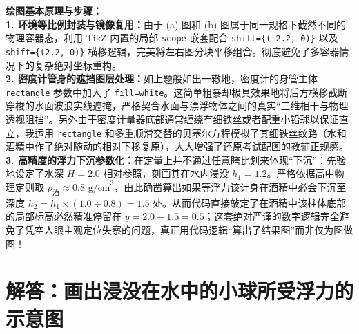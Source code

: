 {\small\color{blue!70!black}
\textbf{绘图基本原理与步骤：}\\
\textbf{1. 环境等比例封装与镜像复用：}由于 (a) 图和 (b) 图属于同一规格下截然不同的物理容器态，利用 TikZ 内置的局部 \texttt{scope} 嵌套配合 \texttt{shift=\{(-2.2, 0)\}} 以及 \texttt{shift=\{(2.2, 0)\}} 横移逻辑，完美将左右图分块平移组合。彻底避免了多容器情况下的复杂绝对坐标重构。\\
\textbf{2. 密度计管身的遮挡图层处理：}如上题般如出一辙地，密度计的身管主体 \texttt{rectangle} 参数中加入了 \texttt{fill=white}。这简单粗暴却极具效果地将后方横移截断穿梭的水面波浪实线遮掩，严格契合水面与漂浮物体之间的真实“三维相干与物理透视阻挡”。另外由于密度计量器底部通常缠绕有细铁丝或者配重小铅球以保证直立，我运用 \texttt{rectangle} 和多重顺滑交替的贝塞尔方程模拟了其细铁丝纹路（水和酒精中作了绝对随动的相对下移复原），大大增强了还原考试配图的教辅正规感。\\
\textbf{3. 高精度的浮力下沉参数化：}在定量上并不通过任意瞎比划来体现“下沉”：先验地设定了水深 $H=2.0$ 相对参照，刻画其在水内浸没 $h_1 = 1.2$。严格依据高中物理定则取 $\rho_{\text{酒}} \approx 0.8\text{ g/cm}^3$，由此确凿算出如果等浮力该计身在酒精中必会下沉至深度 $h_2 = h_1 \times (1.0 \div 0.8) = 1.5$ 处。从而代码直接敲定了在酒精中该柱体底部的局部标高必然精准停留在 $y = 2.0 - 1.5 = 0.5$；这套绝对严谨的数字逻辑完全避免了凭空人眼主观定位失察的问题，真正用代码逻辑“算出了结果图”而非仅为图做图！
}

\vspace{1.0cm}



\section{解答：画出浸没在水中的小球所受浮力的示意图}

\vspace{0.6cm}

